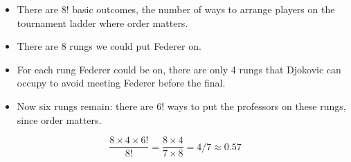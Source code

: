 \documentclass[handout]{beamer}
\begin{document}
\begin{frame}
\begin{itemize}
	\item There are $8!$ basic outcomes, the number of ways to arrange players on the tournament ladder where order matters.\pause
	\item There are 8 rungs we could put Federer on.\pause
	\item For each rung Federer could be on, there are only 4 rungs that Djokovic can occupy to avoid meeting Federer before the final.\pause
	\item Now six rungs remain: there are 6! ways to put the professors on these rungs, since order matters.\pause
\end{itemize}
\vspace{2em}
\alert{$$\frac{8 \times 4 \times 6!}{8!} = \frac{8\times 4}{7\times 8} = 4/7 \approx 0.57$$}

\end{frame}
\end{document}
